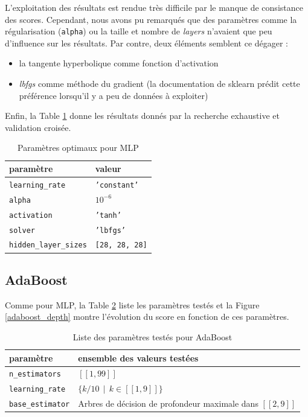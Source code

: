 \documentclass[a4paper]{report}
\begin{document}
L'exploitation des résultats est rendue très difficile par le manque de consistance des scores. Cependant, nous avons pu remarqués que des paramètres comme la régularisation (\texttt{alpha}) ou la taille et nombre de \emph{layers} n'avaient que peu d'influence sur les résultats. Par contre, deux éléments semblent ce dégager : \begin{itemize}
\item la tangente hyperbolique comme fonction d'activation
\item \emph{lbfgs} comme méthode du gradient (la documentation de sklearn prédit cette préférence lorsqu'il y a peu de données à exploiter)
\end{itemize}
Enfin, la Table \ref{best_params_mlp} donne les résultats donnés par la recherche exhaustive et validation croisée.

\begin{table}[h]
\centering
\begin{tabular}{ll}
paramètre & valeur \\
\hline
\texttt{learning\_rate} & \texttt{'constant'} \\
\texttt{alpha} & \texttt{$10^{-6}$} \\
\texttt{activation} & \texttt{'tanh'} \\
\texttt{solver} & \texttt{'lbfgs'} \\
\texttt{hidden\_layer\_sizes} & \texttt{[28, 28, 28]}\\
\end{tabular}
\caption{Paramètres optimaux pour MLP\label{best_params_mlp}}
\end{table}


\subsection{AdaBoost}

Comme pour MLP, la Table \ref{params_ada} liste les paramètres testés et la Figure \ref{adaboost_depth} montre l'évolution du score en fonction de ces paramètres.

\begin{table}[h]
\centering
\begin{tabular}{ll}
paramètre & ensemble des valeurs testées \\
\hline
\texttt{n\_estimators} & $[\![1, 99]\!]$ \\
\texttt{learning\_rate} & $\{k/10 \>\> | \>\> k \in [\![1, 9]\!] \}$ \\
\texttt{base\_estimator} & Arbres de décision de profondeur maximale dans $[\![2, 9]\!]$\\
\end{tabular}
\caption{Liste des paramètres testés pour AdaBoost\label{params_ada}}
\end{table}
\end{document}
